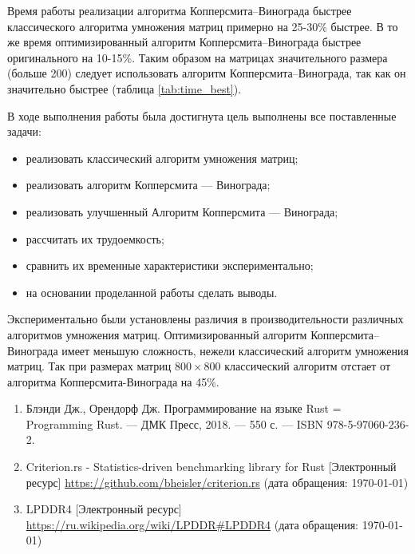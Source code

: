 Время работы реализации алгоритма Копперсмита–Винограда быстрее классического алгоритма умножения матриц примерно на 25-30\% быстрее. В то же время оптимизированный алгоритм Копперсмита–Винограда быстрее оригинального на 10-15\%. Таким образом на матрицах значительного размера (больше 200) следует использовать алгоритм Копперсмита–Винограда, так как он значительно быстрее (таблица \ref{tab:time_best}).




В ходе выполнения работы была достигнута цель выполнены все поставленные задачи:

\begin{itemize}
    \item реализовать классический алгоритм умножения матриц;
    \item реализовать алгоритм Копперсмита — Винограда;
    \item реализовать улучшенный Алгоритм Копперсмита — Винограда;
    \item рассчитать их трудоемкость;
    \item сравнить их временные характеристики экспериментально;
    \item на основании проделанной работы сделать выводы.
\end{itemize}

Экспериментально были установлены различия в производительности различных алгоритмов умножения матриц. Оптимизированный алгоритм Копперсмита–Винограда имеет меньшую сложность, нежели классический алгоритм умножения матриц. Так при размерах матриц $800 \times 800$ классический алгоритм отстает от алгоритма Копперсмита-Винограда на 45\%.


\begin{enumerate}
    \item Блэнди Дж., Орендорф Дж. Программирование на языке Rust = Programming Rust. — ДМК Пресс, 2018. — 550 с. — ISBN 978-5-97060-236-2.
    \item Criterion.rs - Statistics-driven benchmarking library for Rust [Электронный ресурс] \url{https://github.com/bheisler/criterion.rs} (дата обращения: \today)
    \item LPDDR4 [Электронный ресурс] \url{https://ru.wikipedia.org/wiki/LPDDR#LPDDR4} (дата обращения: \today)
\end{enumerate}


